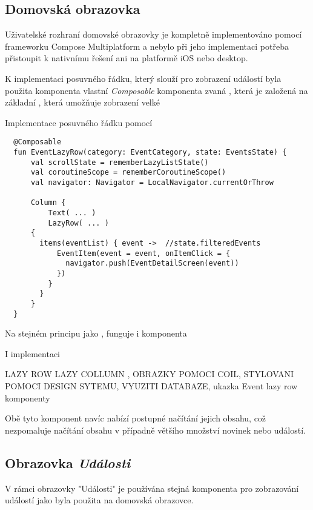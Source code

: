 \subsection{Domovská obrazovka}
Uživatelské rozhraní domovské obrazovky je kompletně implementováno pomocí frameworku Compose Multiplatform a nebylo při jeho implementaci potřeba
přistoupit k nativnímu řešení ani na platformě iOS nebo desktop.

K implementaci posuvného řádku, který slouží pro zobrazení událostí byla použita komponenta vlastní \textit{Composable} komponenta zvaná ,
která je založená na základní , která umožňuje zobrazení velké
\begin{listing}
\caption{Implementace posuvného řádku pomocí }\label{lst:EventLazyRowImpl}
\begin{verbatim}
  @Composable
  fun EventLazyRow(category: EventCategory, state: EventsState) {
      val scrollState = rememberLazyListState()
      val coroutineScope = rememberCoroutineScope()
      val navigator: Navigator = LocalNavigator.currentOrThrow
  
      Column {
          Text( ... )
          LazyRow( ... ) 
      {  
        items(eventList) { event ->  //state.filteredEvents
            EventItem(event = event, onItemClick = {
              navigator.push(EventDetailScreen(event))
            })
          }
        }
      }
  }
\end{verbatim}
\end{listing}

Na stejném principu jako , funguje i komponenta 

I implementaci 

LAZY ROW LAZY COLLUMN , OBRAZKY POMOCI COIL, STYLOVANI POMOCI DESIGN SYTEMU, VYUZITI DATABAZE, ukazka Event lazy row komponenty

Obě tyto komponent navíc nabízí postupné načítání jejich obsahu, což nezpomaluje načítání obsahu v případně většího množství novinek
nebo událostí.

\subsection{Obrazovka \textit{Události}}

V rámci obrazovky "Události" je používána stejná komponenta pro zobrazování událostí jako byla použita na domovská obrazovce. 


